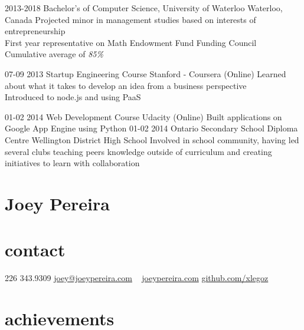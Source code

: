 \documentclass[]{friggeri-cv}
\newcommand{\imp}[1] {{\em #1}}
\begin{document}
\begin{entrylist}
  \entry
    {2013-2018}
    {Bachelor's of Computer Science, University of Waterloo}
    {Waterloo, Canada}
	{Projected minor in management studies based on interests of entrepreneurship \\
	First year representative on Math Endowment Fund Funding Council \\
 Cumulative average of \imp{85\%}}
	
  \entry
  	{07-09 2013}
  	{Startup Engineering Course}
  	{Stanford - Coursera (Online)}
  	{Learned about what it takes to develop an idea from a business perspective \\
  	Introduced to node.js and using PaaS}
  	
  \entry
  	{01-02 2014}
  	{Web Development Course}
  	{Udacity (Online)}
  	{Built applications on Google App Engine using Python }
  \entry
  	{01-02 2014}
  	{Ontario Secondary School Diploma}
  	{Centre Wellington District High School}
    {Involved in school community, having led several clubs teaching peers knowledge outside of curriculum and creating initiatives to learn with collaboration}
\end{entrylist}

\begin{asidetwo}  	
	\section{Joey Pereira}
	\section{contact}
    226 343.9309
    \href{mailto:joey@joeypereira.com}{joey@joeypereira.com}
    ~
    \href{http://joeypereira.com}{joeypereira.com}
    \href{http://www.github.com/xlegoz}{github.com/xlegoz}
\end{asidetwo}






\section{achievements}
\end{document}
